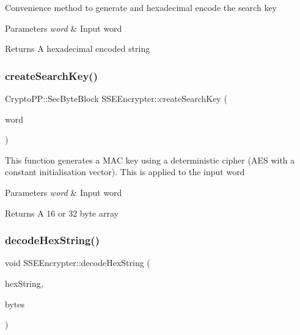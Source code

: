 Convenience method to generate and hexadecimal encode the search key 
\begin{DoxyParams}{Parameters}
{\em word} & Input word \\
\hline
\end{DoxyParams}
\begin{DoxyReturn}{Returns}
A hexadecimal encoded string 
\end{DoxyReturn}
\mbox{\label{classSSEEncrypter_ae81cc103149e1db15c577c8b474f9217}} 
\subsubsection{\texorpdfstring{create\+Search\+Key()}{createSearchKey()}}
{\footnotesize\ttfamily Crypto\+P\+P\+::\+Sec\+Byte\+Block S\+S\+E\+Encrypter\+::create\+Search\+Key (\begin{DoxyParamCaption}\item[{std\+::string \&}]{word }\end{DoxyParamCaption})}

This function generates a M\+AC key using a deterministic cipher (A\+ES with a constant initialisation vector). This is applied to the input word 
\begin{DoxyParams}{Parameters}
{\em word} & Input word \\
\hline
\end{DoxyParams}
\begin{DoxyReturn}{Returns}
A 16 or 32 byte array 
\end{DoxyReturn}
\mbox{\label{classSSEEncrypter_a668394973e3f574ca24588c5a0763f5f}} 
\subsubsection{\texorpdfstring{decode\+Hex\+String()}{decodeHexString()}}
{\footnotesize\ttfamily void S\+S\+E\+Encrypter\+::decode\+Hex\+String (\begin{DoxyParamCaption}\item[{std\+::string \&}]{hex\+String,  }\item[{Crypto\+P\+P\+::\+Sec\+Byte\+Block \&}]{bytes }\end{DoxyParamCaption})\hspace{0.3cm}{\ttfamily [private]}}

